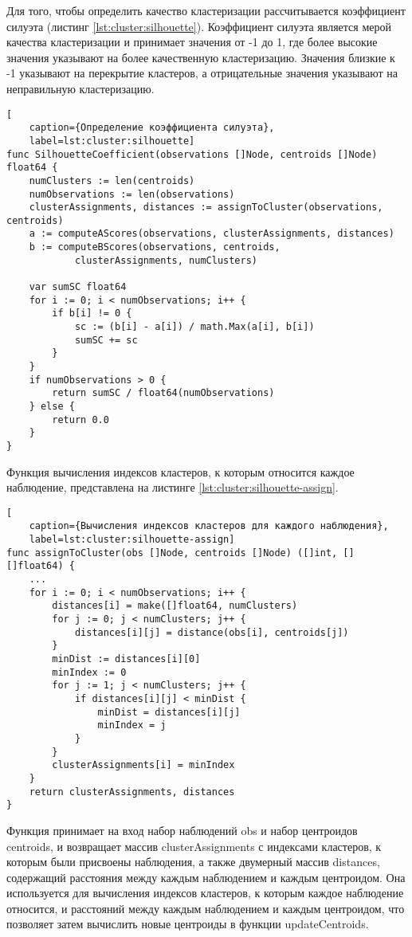 Для того, чтобы определить качество кластеризации рассчитывается коэффициент силуэта (листинг \ref{lst:cluster:silhouette}). Коэффициент силуэта является мерой качества кластеризации и принимает значения от -1 до 1, где более высокие значения указывают на более качественную кластеризацию. Значения близкие к -1 указывают на перекрытие кластеров, а отрицательные значения указывают на неправильную кластеризацию.
\begin{lstlisting}[
	caption={Определение коэффициента силуэта},
	label=lst:cluster:silhouette]
func SilhouetteCoefficient(observations []Node, centroids []Node) float64 {
	numClusters := len(centroids)
	numObservations := len(observations)
	clusterAssignments, distances := assignToCluster(observations, centroids)
	a := computeAScores(observations, clusterAssignments, distances)
	b := computeBScores(observations, centroids, 
			clusterAssignments, numClusters)
	
	var sumSC float64
	for i := 0; i < numObservations; i++ {
		if b[i] != 0 {
			sc := (b[i] - a[i]) / math.Max(a[i], b[i])
			sumSC += sc
		}
	}
	if numObservations > 0 {
		return sumSC / float64(numObservations)
	} else {
		return 0.0
	}
}
\end{lstlisting}
Функция вычисления индексов кластеров, к которым относится каждое наблюдение, представлена на листинге \ref{lst:cluster:silhouette-assign}.
\begin{lstlisting}[
	caption={Вычисления индексов кластеров для каждого наблюдения},
	label=lst:cluster:silhouette-assign]
func assignToCluster(obs []Node, centroids []Node) ([]int, [][]float64) {
	...
	for i := 0; i < numObservations; i++ {
		distances[i] = make([]float64, numClusters)
		for j := 0; j < numClusters; j++ {
			distances[i][j] = distance(obs[i], centroids[j])
		}
		minDist := distances[i][0]
		minIndex := 0
		for j := 1; j < numClusters; j++ {
			if distances[i][j] < minDist {
				minDist = distances[i][j]
				minIndex = j
			}
		}
		clusterAssignments[i] = minIndex
	}
	return clusterAssignments, distances
}
\end{lstlisting}
Функция принимает на вход набор наблюдений obs и набор центроидов centroids, и возвращает массив clusterAssignments с индексами кластеров, к которым были присвоены наблюдения, а также двумерный массив distances, содержащий расстояния между каждым наблюдением и каждым центроидом. Она используется для вычисления индексов кластеров, к которым каждое наблюдение относится, и расстояний между каждым наблюдением и каждым центроидом, что позволяет затем вычислить новые центроиды в функции updateCentroids.

